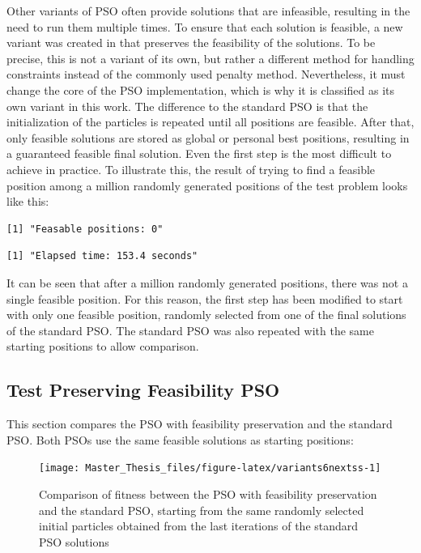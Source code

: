\documentclass[
  oneside, a4paper, 12pt, openany]{book}
\theoremstyle{definition}
\theoremstyle{definition}
\theoremstyle{definition}
\theoremstyle{definition}
\theoremstyle{remark}
\begin{document}
Other variants of PSO often provide solutions that are infeasible, resulting in the need to run them multiple times. To ensure that each solution is feasible, a new variant was created in \citep{XiEb2002} that preserves the feasibility of the solutions. To be precise, this is not a variant of its own, but rather a different method for handling constraints instead of the commonly used penalty method. Nevertheless, it must change the core of the PSO implementation, which is why it is classified as its own variant in this work. The difference to the standard PSO is that the initialization of the particles is repeated until all positions are feasible. After that, only feasible solutions are stored as global or personal best positions, resulting in a guaranteed feasible final solution. Even the first step is the most difficult to achieve in practice. To illustrate this, the result of trying to find a feasible position among a million randomly generated positions of the test problem looks like this:

\begin{verbatim}
[1] "Feasable positions: 0"
\end{verbatim}

\begin{verbatim}
[1] "Elapsed time: 153.4 seconds"
\end{verbatim}

It can be seen that after a million randomly generated positions, there was not a single feasible position. For this reason, the first step has been modified to start with only one feasible position, randomly selected from one of the final solutions of the standard PSO. The standard PSO was also repeated with the same starting positions to allow comparison.

\hypertarget{test-preserving-feasibility-pso}{%
\subsection{Test Preserving Feasibility PSO}\label{test-preserving-feasibility-pso}}

This section compares the PSO with feasibility preservation and the standard PSO. Both PSOs use the same feasible solutions as starting positions:

\begin{figure}[H]
\texttt{[image: Master\_Thesis\_files/figure-latex/variants6nextss-1]} \caption{Comparison of fitness between the PSO with feasibility preservation and the standard PSO, starting from the same randomly selected initial particles obtained from the last iterations of the standard PSO solutions}\label{fig:variants6nextss}
\end{figure}
\end{document}
